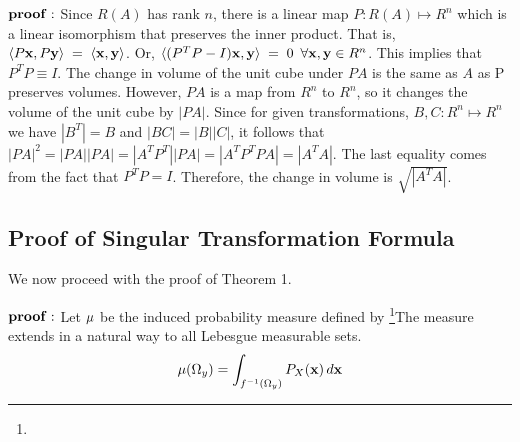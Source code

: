 ${\bf proof:}$ Since $R(A)$ has rank $n$, there is a linear map 
$P: R(A) \mapsto R^n$ which is a linear isomorphism that preserves the 
inner product. That is, $\langle P {\bf x}, P{\bf y}\rangle \; = \; \langle{\bf x}, {\bf y}\rangle$. Or,
$\langle(P^TP  - I){\bf x}, {\bf y}\rangle \; = \; 0 \enspace \forall {\bf x}, {\bf y} \in R^n$. 
This implies that $P^TP \equiv I$. The change in volume of the 
unit cube under $PA$ is the same as $A$ as P preserves volumes. However,
$PA$ is a map from $R^n$ to $R^n$, so it changes the volume of the unit cube
by $|PA|$. Since for given transformations, $B, C: R^n \mapsto R^n$ we have 
$|B^T| = B$ and $|BC| = |B| |C|$, it follows that 
$|PA|^2 = |PA| |PA| = |A^TP^T| |PA| = |A^TP^T P A| = |A^TA|$. The last 
equality comes from the fact that $P^TP = I$.
Therefore, the change in volume is $\sqrt{|A^TA|}$.

\bigskip

\subsection{Proof of Singular Transformation Formula}

We now proceed with the proof of Theorem 1.
\smallskip

${\bf proof:}$ Let ${\bf \mu}$ be the induced probability measure defined by%
\footnote{\raise 2pt \hbox{\dag}}{The measure extends in a natural way to all Lebesgue measurable sets.}
$$
{\bf \mu}(\Omega_y) = \int_{f^{-1}(\Omega_y)} P_X({\bf x}) \, d{\bf x}
$$

